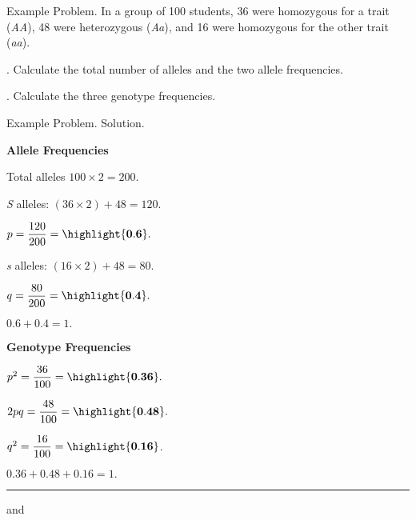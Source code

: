 \documentclass[t,handout]{beamer}  %
\begin{document}
\begin{frame}{Example Problem. }
	\hangpara In a group of 100 students, 36 were homozygous for a trait (\emph{AA}), 48 were heterozygous (\emph{Aa}), and 16 were homozygous for the other trait (\emph{aa}).

	. Calculate the total number of alleles and the two allele frequencies.

	. Calculate the three genotype frequencies.

\end{frame}
%
{
\begin{frame}{Example Problem. Solution.}
\begin{multicols}{2}

	\hangpara \textbf{Allele Frequencies}
	
	\hangpara Total alleles $100 \times 2 = 200.$
	
	\hangpara \emph{S} alleles: $(36 \times 2) + 48 = 120.$
	
	\hangpara $p = \dfrac{120}{200} = \highlight{\mathbf{0.6}}.$

	\hangpara \emph{s} alleles: $(16 \times 2) + 48 = 80.$ 

	\hangpara $q = \dfrac{80}{200} = \highlight{\mathbf{0.4}}.$
	
	\hangpara $0.6 + 0.4 = 1.$ \checkmark

\columnbreak

	\hangpara \textbf{Genotype Frequencies}
	
	\hangpara $p^2=  \dfrac{36}{100} =\highlight{\mathbf{0.36}}.$  

	\hangpara $2pq = \dfrac{48}{100} = \highlight{\mathbf{0.48}}.$

	\hangpara $q^2 = \dfrac{16}{100} = \highlight{\mathbf{0.16}}$.

	\hangpara $0.36 + 0.48 + 0.16 =1.$ \checkmark
	
	\rule{0.4\textwidth}{0.1pt}\vspace{-0.5\baselineskip}
	
	\hangpara {} and
	

\end{multicols}

\end{frame}
}
\end{document}
